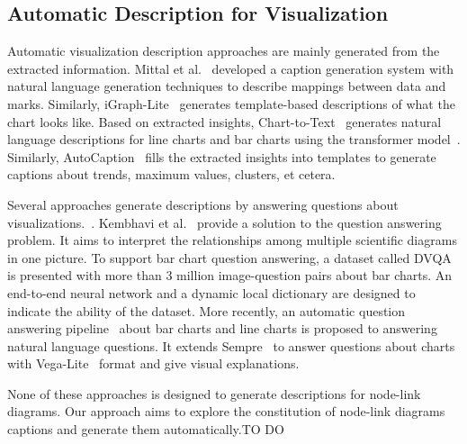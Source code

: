 \subsection{Automatic Description for Visualization}
Automatic visualization description approaches are mainly generated from the extracted information. Mittal et al.~\cite{DBLP:journals/coling/MittalMCR98} developed a caption generation system with natural language generation techniques to describe mappings between data and marks.
Similarly, iGraph-Lite~\cite{DBLP:journals/tochi/FerresLST13} generates template-based descriptions of what the chart looks like.
Based on extracted insights, Chart-to-Text~\cite{DBLP:conf/inlg/ObeidH20} generates natural language descriptions for line charts and bar charts using the transformer model~\cite{DBLP:conf/nips/VaswaniSPUJGKP17}. 
Similarly, AutoCaption~\cite{DBLP:conf/apvis/LiuXHWY20} fills the extracted insights into templates to generate captions about trends, maximum values, clusters, et cetera. 

Several approaches generate descriptions by answering questions about visualizations.~\cite{DBLP:conf/cvpr/KaflePCK18, DBLP:conf/chi/KimHA20, DBLP:conf/eccv/KembhaviSKSHF16}.
Kembhavi et al.~\cite{DBLP:conf/eccv/KembhaviSKSHF16} provide a solution to the question answering problem. 
It aims to interpret the relationships among multiple scientific diagrams in one picture. 
To support bar chart question answering, a dataset called DVQA~\cite{DBLP:conf/cvpr/KaflePCK18} is presented with more than 3 million image-question pairs about bar charts. 
An end-to-end neural network and a dynamic local dictionary are designed to indicate the ability of the dataset.
More recently, an automatic question answering pipeline~\cite{DBLP:conf/chi/KimHA20} about bar charts and line charts is proposed to answering natural language questions. It extends Sempre~\cite{DBLP:conf/acl/PasupatL15, DBLP:conf/emnlp/ZhangPL17} to answer questions about charts with Vega-Lite~\cite{DBLP:journals/tvcg/SatyanarayanMWH17} format and give visual explanations.

None of these approaches is designed to generate descriptions for node-link diagrams. Our approach aims to explore the constitution of node-link diagrams captions and generate them automatically.{\colorbox{text-highlight}{TO DO}} %